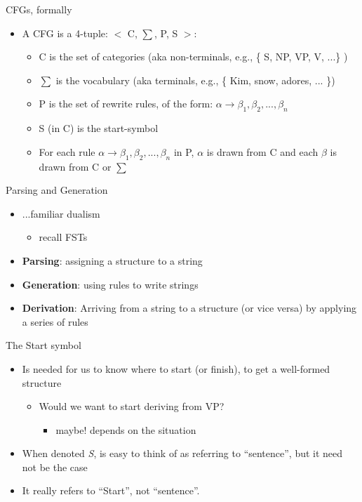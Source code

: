 \documentclass{beamer}
\begin{document}
\begin{frame}{CFGs, formally}
  \begin{itemize}
  \item A CFG is a 4-tuple: $<$ C, $\sum$, P, S $>$:
    \begin{itemize}
    \item C is the set of categories (aka non-terminals, e.g., \{ S,
      NP, VP, V, ...\} )
    \item $\sum$ is the vocabulary (aka terminals, e.g., \{ Kim, snow,
      adores, ... \})
    \item P is the set of rewrite rules, of the form:
      $\alpha \rightarrow \beta_1, \beta_2, ...,\beta_n$
    \item S (in C) is the start-symbol
    \item For each rule
      $\alpha \rightarrow \beta_1, \beta_2, ...,\beta_n$ in P,
      $\alpha$ is drawn from C and each $\beta$ is drawn from C or
      $\sum$
    \end{itemize}
\end{itemize}
\end{frame}

\begin{frame}{Parsing and Generation}
  \begin{itemize}
  \item ...familiar dualism
    \begin{itemize}
    \item recall FSTs
    \end{itemize}
  \item {\bf Parsing}: assigning a structure to a string
  \item {\bf Generation}: using rules to write strings
  \item {\bf Derivation}: Arriving from a string to a structure (or vice versa) by applying a series of rules
  \end{itemize}
\end{frame}

\begin{frame}{The Start symbol}
  \begin{itemize}
  \item Is needed for us to know where to start (or finish), to get a well-formed structure
    \begin{itemize}
    \item Would we want to start deriving from VP?
      \begin{itemize}
      \item maybe! depends on the situation
      \end{itemize}
    \end{itemize}
  \item When denoted {\it S}, is easy to think of as referring to ``sentence'', but it need not be the case
  \item It really refers to ``Start'', not ``sentence''.
  \end{itemize}
\end{frame}
\end{document}
